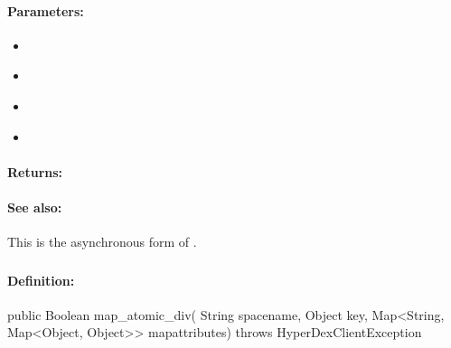 \paragraph{Parameters:}
\begin{itemize}[noitemsep]
\item {}\\

\item {}\\

\item {}\\

\item {}\\

\end{itemize}

\paragraph{Returns:}


\paragraph{See also:}  This is the asynchronous form of .

\pagebreak
\subsubsection{}
\label{api:java:map_atomic_div}


\paragraph{Definition:}
\begin{javacode}
public Boolean map_atomic_div(
        String spacename,
        Object key,
        Map<String, Map<Object, Object>> mapattributes) throws HyperDexClientException
\end{javacode}


